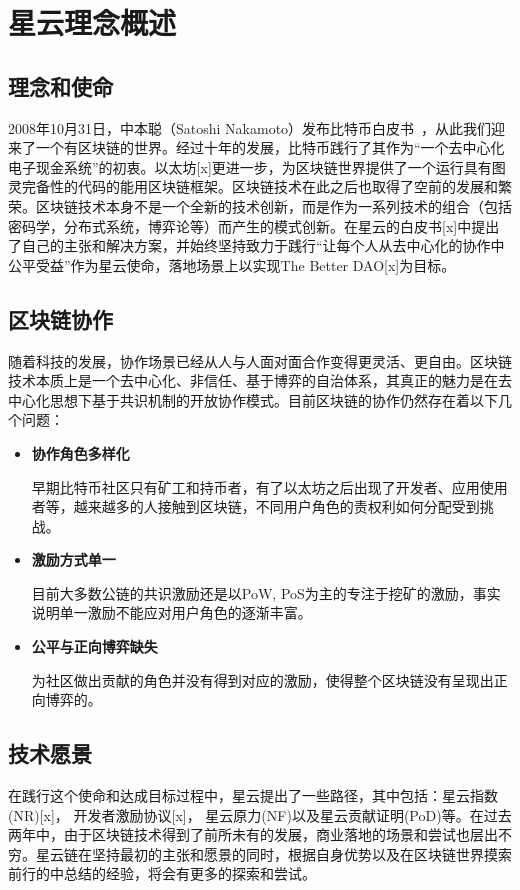 \section{星云理念概述}

\subsection{理念和使命}
2008年10⽉31⽇，中本聪（Satoshi Nakamoto）发布⽐特币⽩⽪书~\cite{whitepaper}，从此我们迎来了⼀个有区块链的世界。经过十年的发展，⽐特币践⾏了其作为“⼀个去中⼼化电⼦现⾦系统”的初衷。以太坊[x]更进一步，为区块链世界提供了一个运行具有图灵完备性的代码的能用区块链框架。区块链技术在此之后也取得了空前的发展和繁荣。区块链技术本身不是一个全新的技术创新，而是作为一系列技术的组合（包括密码学，分布式系统，博弈论等）而产生的模式创新。在星云的白皮书[x]中提出了自己的主张和解决方案，并始终坚持致力于践行“让每个人从去中心化的协作中公平受益”作为星云使命，落地场景上以实现The Better DAO[x]为目标。


\subsection{区块链协作}
随着科技的发展，协作场景已经从人与人面对面合作变得更灵活、更自由。区块链技术本质上是一个去中心化、非信任、基于博弈的自治体系，其真正的魅力是在去中心化思想下基于共识机制的开放协作模式。目前区块链的协作仍然存在着以下几个问题：

\begin{itemize}

	\item \textbf{协作角色多样化}

	早期比特币社区只有矿工和持币者，有了以太坊之后出现了开发者、应用使用者等，越来越多的人接触到区块链，不同用户角色的责权利如何分配受到挑战。

	\item \textbf{激励方式单一}

	目前大多数公链的共识激励还是以PoW, PoS为主的专注于挖矿的激励，事实说明单一激励不能应对用户角色的逐渐丰富。

	\item \textbf{公平与正向博弈缺失}

	为社区做出贡献的角色并没有得到对应的激励，使得整个区块链没有呈现出正向博弈的。

\end{itemize}

\subsection{技术愿景}
在践行这个使命和达成目标过程中，星云提出了一些路径，其中包括：星云指数(NR)[x]， 开发者激励协议[x]， 星云原力(NF)以及星云贡献证明(PoD)等。在过去两年中，由于区块链技术得到了前所未有的发展，商业落地的场景和尝试也层出不穷。星云链在坚持最初的主张和愿景的同时，根据自身优势以及在区块链世界摸索前行的中总结的经验，将会有更多的探索和尝试。
